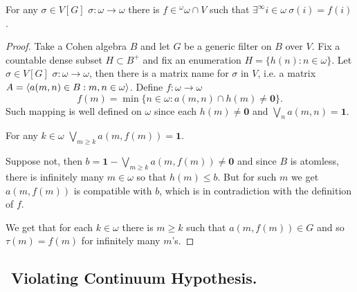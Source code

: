 \begin{lemma}
 For any $\sigma \in V[G]$ $\sigma : \omega \to \omega$ there is $f \in {}^\omega \omega \cap V$
 such that $\exists^\infty i \in \omega \ \sigma(i) = f(i)$.
\end{lemma}

\begin{proof}
 Take a Cohen algebra $B$ and let $G$ be a generic filter on $B$ over $V$.
 Fix a countable dense subset $H \subset B^+$ and fix an enumeration
$H = \{h(n) : n \in \omega \}$. Let $\sigma \in V[G]$ $\sigma : \omega \to \omega$,
then there is a matrix name for $\sigma$ in $V$, i.e. a matrix
$A = \langle a(m,n) \in B : m,n \in \omega \rangle$. Define $f:\omega \to \omega$
$$
f(m) = \min \{n \in \omega : a(m,n) \cap h(m) \not = \mathbf 0\}.
$$
Such mapping is well defined on $\omega$ since each $h(m) \not = \mathbf 0$
and $\bigvee_n a(m,n) = \mathbf 1$.

\smallskip

 For any $k \in \omega$ $\bigvee_{m \geq k} a(m,f(m)) = \mathbf 1$.

\smallskip

Suppose not, then $b = \mathbf 1 - \bigvee_{m \geq k} a(m,f(m)) \not = \mathbf 0$
and since $B$ is atomless, there is infinitely many $m \in \omega$ so that
$h(m) \leq b$. But for such $m$ we get $a(m,f(m))$ is compatible with $b$, which
is in contradiction with the definition of $f$.

We get that for each $k \in \omega$ there is $m \geq k$ such that $a(m,f(m)) \in G$
and so $\tau(m) = f(m)$ for infinitely many $m$'s.
\end{proof}


\subsection{${}$ \hspace{-1em}Violating Continuum Hypothesis.}



